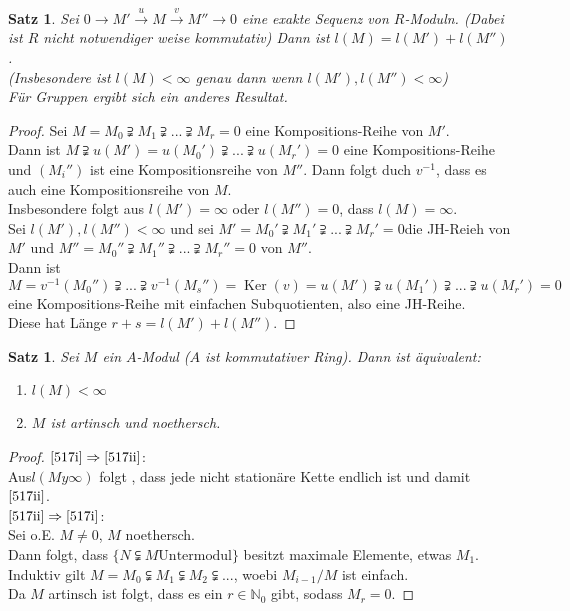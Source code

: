 \documentclass[10pt,a4paper]{article}
\newcommand{\N}{\ensuremath{\mathbb{N}}}
\newcommand{\Ker}{\ensuremath{\operatorname{Ker}}}
\newcounter{thm}[section]
\theoremstyle{definition}
\theoremstyle{plain}
\newtheorem{satz}[thm]{Satz}
\theoremstyle{remark}
\begin{document}
\begin{satz} %
	Sei $0\rightarrow M'\xrightarrow{u} M\xrightarrow{v} M''\rightarrow 0$ eine exakte Sequenz von $R$-Moduln. (Dabei ist $R$ nicht notwendiger weise kommutativ) Dann ist $l(M)=l(M')+l(M'')$.\\
	(Insbesondere ist $l(M)<\infty$ genau dann wenn $l(M'),l(M'')<\infty$)\\
	Für Gruppen ergibt sich ein anderes Resultat.
\end{satz}
\begin{proof}
	 Sei $M=M_0\supsetneqq M_1\supsetneqq...\supsetneqq M_r=0$ eine Kompositions-Reihe von $M'$.\\
	 Dann ist $M\supsetneqq u(M')=u(M_0')\supsetneqq...\supsetneqq u(M_r')=0$ eine Kompositions-Reihe und $(M_i'')$ ist eine Kompositionsreihe von $M''$. Dann folgt duch $v^{-1}$, dass es auch eine Kompositionsreihe von $M$.\\
	 Insbesondere folgt aus $l(M')=\infty $ oder $l(M'')=0$, dass $l(M)=\infty$.\\
	 Sei $l(M'),l(M'')<\infty$ und sei
	 $M'=M_0'\supsetneqq M_1'\supsetneqq...\supsetneqq M_r'=0$die JH-Reieh von $M'$ und $M''=M_0''\supsetneqq M_1''\supsetneqq...\supsetneqq M_r''=0$ von $M''$.\\
	 Dann ist
	 \[M=v^{-1}(M_0'')\supsetneqq ...\supsetneqq v^{-1}(M_s'')=\Ker(v)=u(M')\supsetneqq u(M_1')\supsetneqq...\supsetneqq u(M_r')=0\]
	 eine Kompositions-Reihe mit einfachen Subquotienten, also eine JH-Reihe.\\
	 Diese hat Länge $r+s=l(M')+l(M'')$.
\end{proof}

\begin{satz}\label{517Satz}
	Sei $M$ ein $A$-Modul ($A$ ist kommutativer Ring). Dann ist äquivalent:\begin{enumerate}
		\item $l(M)<\infty$ \label{517i}
		\item $M$ ist artinsch und noethersch.\label{517ii}
	\end{enumerate}
\end{satz}
\begin{proof}
	$\ref{517i}\Rightarrow\ref{517ii}$: \\
	Aus$l(My\infty)$ folgt , dass jede nicht stationäre Kette endlich ist und damit $\ref{517ii}$.\\
	$\ref{517ii}\Rightarrow\ref{517i}$: \\
	Sei o.E. $M\neq 0$, $M$ noethersch.\\
	Dann folgt, dass $\{N\subsetneqq M\text{Untermodul}\}$ besitzt maximale Elemente, etwas $M_1$.\\
	Induktiv gilt $M=M_0\subsetneqq M_1\subsetneqq M_2\subsetneqq ...$, woebi $M_{i-1}/M$ ist einfach.\\
	Da $M$ artinsch ist folgt, dass es ein $r\in\N_0$ gibt, sodass $M_r=0$.
\end{proof}
\end{document}
